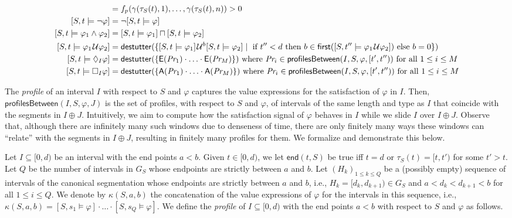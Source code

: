 \scriptsize
\begin{align*}
	[S,t \models p] &=  f_p(\gamma(\tau_S(t), 1), \ldots, \gamma(\tau_S(t), n)) > 0 \\
	[S,t \models \lnot \varphi] &= \lnot [S,t \models \varphi] \\
	[S,t \models \varphi_1 \land \varphi_2] &= [S,t \models \varphi_1] \sqcap [S,t \models \varphi_2] \\
	[S,t \models \varphi_1 \until \varphi_2] &= \destutter(\{ [S,t \models \varphi_1] \until^b [S,t \models \varphi_2] \st \text{ if $t'' < d$ then $b \in \first([S,t'' \models \varphi_1 \until \varphi_2])$ else $b = 0$} \}) \\
	[S,t \models \LTLf_I \varphi] &= \destutter(\{ \mathsf{E}(\textit{Pr}_1) \cdot \ldots \cdot \mathsf{E}(\textit{Pr}_M) \}) \text{ where $\textit{Pr}_i \in \mathsf{profilesBetween}(I, S, \varphi, [t',t''))$ for all $1 \leq i \leq M$} \\
	[S,t \models \LTLg_I \varphi] &= \destutter(\{ \mathsf{A}(\textit{Pr}_1) \cdot \ldots \cdot \mathsf{A}(\textit{Pr}_M) \}) \text{ where $\textit{Pr}_i \in \mathsf{profilesBetween}(I, S, \varphi, [t',t''))$ for all $1 \leq i \leq M$}
\end{align*}
\normalsize

The \emph{profile} of an interval $I$ with respect to $S$ and $\varphi$ captures the value expressions for the satisfaction of $\varphi$ in $I$.
Then, $\mathsf{profilesBetween}(I, S, \varphi, J)$ is the set of profiles, with respect to $S$ and $\varphi$, of intervals of the same length and type as $I$ that coincide with the segments in $I \oplus J$.
Intuitively, we aim to compute how the satisfaction signal of $\varphi$ behaves in $I$ while we slide $I$ over $I \oplus J$.
Observe that, although there are infinitely many such windows due to denseness of time, there are only finitely many ways these windows can ``relate'' with the segments in $I \oplus J$, resulting in finitely many profiles for them.
We formalize and demonstrate this below.

Let $I \subseteq [0,d)$ be an interval with the end points $a < b$.
Given $t \in [0,d)$, we let $\mathsf{end}(t, S)$ be true iff $t=d$ or $\tau_S(t) = [t, t')$ for some $t' > t$.
Let $Q$ be the number of intervals in $G_S$ whose endpoints are strictly between $a$ and $b$.
Let $(H_k)_{1 \leq k \leq Q}$ be a (possibly empty) sequence of intervals of the canonical segmentation whose endpoints are strictly between $a$ and $b$, i.e., $H_k = [d_k, d_{k+1}) \in G_S$ and $a < d_k < d_{k+1} < b$ for all $1 \leq i \leq Q$.
We denote by $\kappa(S, a, b)$ the concatenation of the value expressions of $\varphi$ for the intervals in this sequence, i.e., $\kappa(S, a, b) = [S, s_1 \models \varphi] \cdot \ldots \cdot [S, s_Q \models \varphi]$.
We define the \emph{profile} of $I \subseteq [0,d)$ with the end points $a < b$ with respect to $S$ and $\varphi$ as follows.

